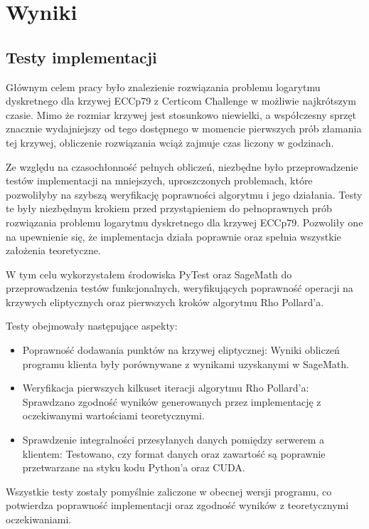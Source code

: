 \newpage
\section{Wyniki}
\subsection{Testy implementacji}

Głównym celem pracy było znalezienie rozwiązania problemu logarytmu dyskretnego
dla krzywej ECCp79 z Certicom Challenge w możliwie najkrótszym czasie. Mimo że
rozmiar krzywej jest stosunkowo niewielki, a współczesny sprzęt znacznie
wydajniejszy od tego dostępnego w momencie pierwszych prób złamania tej krzywej,
obliczenie rozwiązania wciąż zajmuje czas liczony w godzinach.

Ze względu na czasochłonność pełnych obliczeń, niezbędne było przeprowadzenie
testów implementacji na mniejszych, uproszczonych problemach, które pozwoliłyby
na szybszą weryfikację poprawności algorytmu i jego działania. Testy te były
niezbędnym krokiem przed przystąpieniem do pełnoprawnych prób rozwiązania
problemu logarytmu dyskretnego dla krzywej ECCp79. Pozwoliły one na upewnienie się,
że implementacja działa poprawnie oraz spełnia wszystkie założenia teoretyczne.

W tym celu wykorzystałem środowiska PyTest oraz SageMath do przeprowadzenia testów
funkcjonalnych, weryfikujących poprawność operacji na krzywych eliptycznych
oraz pierwszych kroków algorytmu Rho Pollard'a.

Testy obejmowały następujące aspekty:
\begin{itemize}
    \item Poprawność dodawania punktów na krzywej eliptycznej:
          Wyniki obliczeń programu klienta były porównywane z wynikami uzyskanymi
          w SageMath.
    \item Weryfikacja pierwszych kilkuset iteracji algorytmu Rho Pollard'a:
          Sprawdzano zgodność wyników generowanych przez implementację z oczekiwanymi
          wartościami teoretycznymi.
    \item Sprawdzenie integralności przesyłanych danych pomiędzy serwerem a
          klientem: Testowano, czy format danych oraz zawartość są poprawnie przetwarzane
          na styku kodu Python'a oraz CUDA.
\end{itemize}

Wszystkie testy zostały pomyślnie zaliczone w obecnej wersji programu, co
potwierdza poprawność implementacji oraz zgodność wyników z teoretycznymi
oczekiwaniami.

